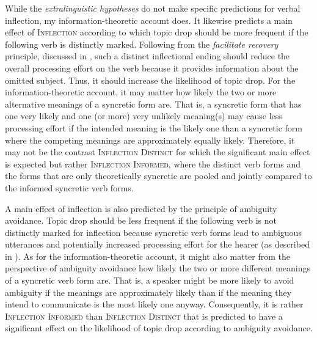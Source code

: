 While the \textit{extralinguistic hypotheses} do not make specific predictions for verbal inflection, my information-theoretic account does.  
It likewise predicts a main effect of \textsc{Inflection} according to which topic drop should be more frequent if the following verb is distinctly marked.
Following from the \textit{facilitate recovery} principle,  discussed in , such a distinct inflectional ending should reduce the overall processing effort  on the verb because it provides information about the omitted subject.
Thus, it should increase the likelihood of topic drop.
For the information-theoretic account,  it may matter how likely the two or more alternative meanings of a syncretic form are.
That is, a syncretic form that has one very likely and one (or more) very unlikely meaning(s) may cause less processing effort if the intended meaning is the likely one than a syncretic form where the competing meanings are approximately equally likely.
Therefore, it may not be the contrast \textsc{Inflection Distinct} for which the significant main effect is expected but rather \textsc{Inflection Informed}, where the distinct verb forms and the forms that are only theoretically syncretic are pooled and jointly compared to the informed syncretic verb forms.

A main effect of inflection is also predicted by the principle of ambiguity avoidance. 
Topic drop should be less frequent if the following verb is not distinctly marked for inflection because syncretic verb forms lead to ambiguous utterances and potentially increased processing effort for the hearer (as described in ).
As for the information-theoretic account, it might also matter from the perspective of ambiguity avoidance how likely the two or more different meanings of a syncretic verb form are.
That is, a speaker might be more likely to avoid ambiguity if the meanings are approximately likely than if the meaning they intend to communicate is the most likely one anyway.
Consequently, it is rather \textsc{Inflection Informed} than \textsc{Inflection Distinct} that is predicted to have a significant effect on the likelihood of topic drop according to ambiguity avoidance. 

